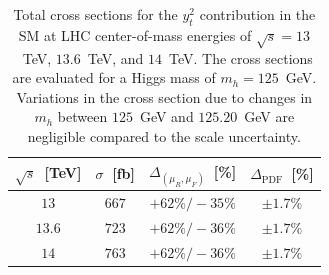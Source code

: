 \documentclass[11pt,a4paper]{article}
\begin{document}
\begin{table}[t]
\begin{center}%
\begin{small}%
\begin{tabular}{cccc}%
$\sqrt{s}$~[TeV] & $\sigma^{}$~[fb] & $\Delta_{\left(\mu_{R},\mu_{F}\right)}$~[\%] & $\Delta_{\mathrm{PDF}}$~[\%]  \\\hline
$13$ & $667$ & $+62\% / -35\%$ & $\pm 1.7\%$ \\
$13.6$  & $723$ & $+62\% / -36\%$ & $\pm 1.7\%$ \\
$14$ & $763$ & $+62\% / -36\%$ & $\pm 1.7\%$ \\
\end{tabular}%
\end{small}%
\end{center}%
\caption{Total \bbH{} cross sections for the $y_t^2$ contribution in the SM at LHC center-of-mass energies of $\sqrt{s} = 13$~TeV, $13.6$~TeV, and $14$~TeV. The cross sections are evaluated for a Higgs mass of $m_h = 125$~GeV. Variations in the cross section due to changes in $m_h$ between $125$~GeV and $125.20$~GeV are negligible compared to the scale uncertainty.}
\label{tab:bbHytxsec}
\end{table}
%
%
\end{document}
